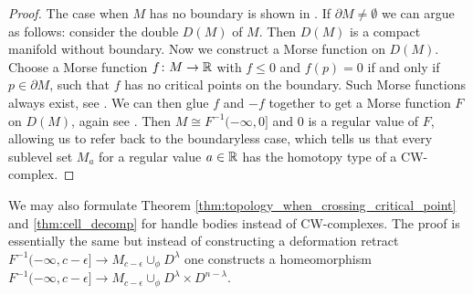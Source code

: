     \begin{proof}
        The case when $M$ has no boundary is shown in \cite{milnor1963morse}. If $\partial M \neq \emptyset$ we can argue as follows: consider the double $D(M)$ of $M$. Then $D(M)$ is a compact manifold without boundary. Now we construct a Morse function on $D(M)$. Choose a Morse function $f \colon M \to \mathbb{R}$ with $f \leq 0$ and $f(p) = 0$ if and only if $p \in \partial M$, such that $f$ has no critical points on the boundary. Such Morse functions always exist, see \cite{BA}. We can then glue $f$ and $-f$ together to get a Morse function $F$ on $D(M)$, again see \cite{BA}. Then $M \cong F^{-1}(-\infty,0]$ and $0$ is a regular value of $F$, allowing us to refer back to the boundaryless case, which tells us that every sublevel set $M_a$ for a regular value $a \in \mathbb{R}$ has the homotopy type of a CW-complex.
    \end{proof}

    \begin{remark}
        We may also formulate Theorem \ref{thm:topology_when_crossing_critical_point} and \ref{thm:cell_decomp} for handle bodies instead of CW-complexes. The proof is essentially the same but instead of constructing a deformation retract $F^{-1}(-\infty,c-\epsilon] \to M_{c-\epsilon} \cup_\phi D^\lambda$ one constructs a homeomorphism $F^{-1}(-\infty,c-\epsilon] \to M_{c-\epsilon} \cup_\phi D^\lambda \times D^{n-\lambda}$.
    \end{remark}
